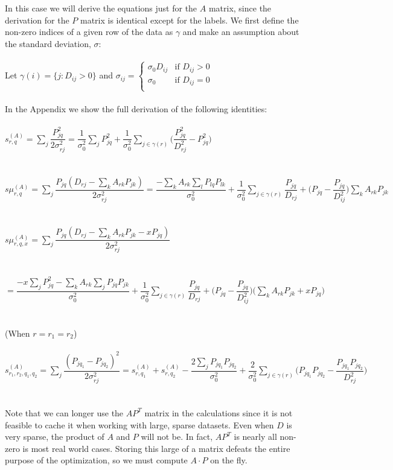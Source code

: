 \documentclass[]{article}
\begin{document}
In this case we will derive the equations just for the $A$ matrix, since the derivation for the $P$ matrix is identical except for the labels. We first define the non-zero indices of a given row of the data as $\gamma$ and make an assumption about the standard deviation, $\sigma$:\\
\\
Let $\gamma(i) = \{j : D_{ij} > 0\}$ and $
\sigma_{ij} = 
\begin{cases}
\sigma_0D_{ij} & \text{if } D_{ij} > 0\\
\sigma_0 & \text{if } D_{ij} = 0\\
\end{cases}
$\\
\\
In the Appendix we show the full derivation of the following identities:\\
\\
$s^{(A)}_{r,q}
=\sum_j \dfrac{P_{jq}^2}{2\sigma_{rj}^2}
=\dfrac{1}{\sigma_0^2}\sum_j P^2_{jq} + \dfrac{1}{\sigma_0^2}\sum_{j\in\gamma(r)} \biggr(\dfrac{P^2_{jq}}{D^2_{rj}} - P^2_{jq}\biggr)$\\
\\
\\
$s\mu^{(A)}_{r,q}
=\sum_j \dfrac{P_{jq}(D_{rj} - \sum_{k} A_{rk} P_{jk})}{2\sigma_{rj}^2}
=\dfrac{-\sum_k A_{rk} \sum_l P_{lq} P_{lk}}{\sigma_0^2} + \dfrac{1}{\sigma_0^2}\sum_{j \in \gamma(r)} \dfrac{P_{jq}}{D_{rj}} + \biggr(P_{jq} - \dfrac{P_{jq}}{D_{ij}^2}\biggr) \sum_k A_{rk}P_{jk}$\\
\\
\\
$s\mu_{r,q,x}^{(A)}
=\sum_j \dfrac{P_{jq}(D_{rj} - \sum_k A_{rk}P_{jk} - xP_{jq})}{2\sigma_{rj}^2}$\\
\\
\\
\hspace*{11mm}$=\dfrac{-x\sum_j P_{jq}^2 - \sum_k A_{rk} \sum_j P_{jq} P_{jk}}{\sigma_0^2} + \dfrac{1}{\sigma_0^2}\sum_{j \in \gamma(r)} \dfrac{P_{jq}}{D_{rj}} + \biggr(P_{jq} - \dfrac{P_{jq}}{D_{ij}^2}\biggr) \biggr(\sum_k A_{rk}P_{jk} + xP_{jq}\biggr)$\\
\\
\\
(When $r = r_1 = r_2$)\\
\\
$s^{(A)}_{r_1,r_2,q_1,q_2}
=\sum_j \dfrac{(P_{jq_1} - P_{jq_2})^2}{2\sigma_{rj}^2}
=s^{(A)}_{r,q_1} + s^{(A)}_{r,q_2} - \dfrac{2\sum_j P_{jq_1}P_{jq_2}}{\sigma_0^2} + \dfrac{2}{\sigma_0^2}\sum_{j\in\gamma(r)} \biggr(P_{jq_1}P_{jq_2} - \dfrac{P_{jq_1}P_{jq_2}}{D_{rj}^2}\biggr)$\\
\\
\\
Note that we can longer use the $AP^T$ matrix in the calculations since it is not feasible to cache it when working with large, sparse datasets. Even when $D$ is very sparse, the product of $A$ and $P$ will not be. In fact, $AP^T$ is nearly all non-zero is most real world cases. Storing this large of a matrix defeats the entire purpose of the optimization, so we must compute $A \cdot P$ on the fly.
\end{document}
